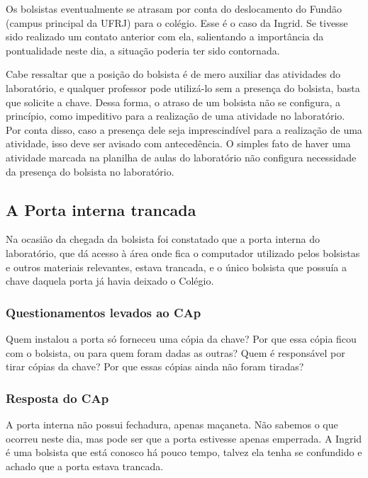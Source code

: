Os bolsistas eventualmente se atrasam por conta do deslocamento do Fundão (campus principal da UFRJ) para o colégio. Esse é o caso da Ingrid. Se tivesse sido realizado um contato anterior com ela, salientando a importância da pontualidade neste dia, a situação poderia ter sido contornada.

Cabe ressaltar que a posição do bolsista é de mero auxiliar das atividades do laboratório, e qualquer professor pode utilizá-lo sem a presença do bolsista, basta que solicite a chave. Dessa forma, o atraso de um bolsista não se configura, a princípio, como impeditivo para a realização de uma atividade no laboratório. Por conta disso, caso a presença dele seja imprescindível para a realização de uma atividade, isso deve ser avisado com antecedência. O simples fato de haver uma atividade marcada na planilha de aulas do laboratório não configura necessidade da presença do bolsista no laboratório.

\subsection{A Porta interna trancada}\label{sec:LABEL_CHP_REL_SEC_PROBS_SUBSEC_POR}

Na ocasião da chegada da bolsista foi constatado que a porta interna do laboratório, que dá acesso à área onde fica o computador utilizado pelos bolsistas e outros materiais relevantes, estava trancada, e o único bolsista que possuía a chave daquela porta já havia deixado o Colégio.

\subsubsection{Questionamentos levados ao CAp}

Quem instalou a porta só forneceu uma cópia da chave? Por que essa cópia ficou com o bolsista, ou para quem foram dadas as outras? Quem é responsável por tirar cópias da chave? Por que essas cópias ainda não foram tiradas?

\subsubsection{Resposta do CAp}

A porta interna não possui fechadura, apenas maçaneta. Não sabemos o que ocorreu neste dia, mas pode ser que a porta estivesse apenas emperrada. A Ingrid é uma bolsista que está conosco há pouco tempo, talvez ela tenha se confundido e achado que a porta estava trancada.

